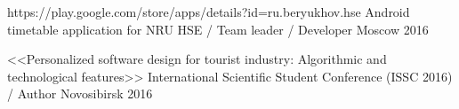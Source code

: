 \begin{cventries}
\cventry
{https://play.google.com/store/apps/details?id=ru.beryukhov.hse} %
{Android timetable application for NRU HSE / Team leader / Developer} %
{Moscow} %
{2016} %
{}









\cventry
{<<Personalized software design for tourist industry: Algorithmic and technological features>>} %
{International Scientific Student Conference (ISSC 2016) / Author} %
{Novosibirsk} %
{2016} %
{}




\end{cventries}
